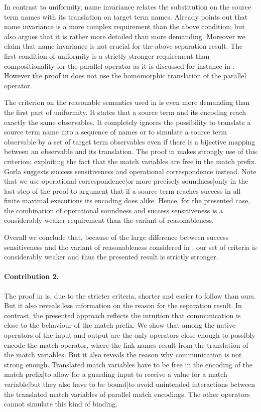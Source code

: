 \documentclass[]{article}
\begin{document}
In contrast to uniformity, name invariance relates the substitution on the source term names with its translation on target term names. Already \cite{gorla} points out that name invariance is a more complex requirement than the above condition; but \cite{gorla} also argues that it is rather more detailed than more demanding. Moreover we claim that name invariance is not crucial for the above separation result.
The first condition of uniformity is a strictly stronger requirement than compositionality for the parallel operator as it is discussed for instance in \cite{petphd}. However the proof in \cite{carbone} does not use the homomorphic translation of the parallel operator.

The criterion on the reasonable semantics used in \cite{carbone} is even more demanding than the first part of uniformity. It states that a source term and its encoding reach exactly the same observables.
It completely ignores the possibility to translate a source term name into a sequence of names or to simulate a source term observable by a set of target term observables even if there is a bijective mapping between an observable and its translation. The proof in \cite{carbone} makes strongly use of this criterion; exploiting the fact that the match variables are free in the match prefix.
Gorla suggests success sensitiveness and operational correspondence instead. Note that we use operational correspondence|or more precisely soundness|only in the last step of the proof to argument that if a source term reaches success in all finite maximal executions its encoding does alike. Hence, for the presented case, the combination of operational soundness and success sensitiveness is a considerably weaker requirement than the variant of reasonableness.

Overall we conclude that, because of the large difference between success sensitiveness and the variant of reasonableness considered in \cite{carbone}, our set of criteria is considerably weaker and thus the presented result is strictly stronger.

\paragraph{Contribution 2.}
The proof in \cite{carbone} is, due to the stricter criteria, shorter and easier to follow than ours. But it also reveals less information on the reason for the separation result. In contrast, the presented approach reflects the intuition that communication is close to the behaviour of the match prefix. We show that among the native operators of the \piCal input and output are the only operators close enough to possibly encode the match operator, where the link names result from the translation of the match variables. But it also reveals the reason why communication is not strong enough.
Translated match variables have to be free in the encoding of the match {prefix}|{to} allow for a guarding input to receive a value for a match {variable}|{but} they also have to be {bound}|{to} avoid unintended interactions between the translated match variables of parallel match encodings.
The other \piCal operators cannot simulate this kind of binding.
\end{document}
